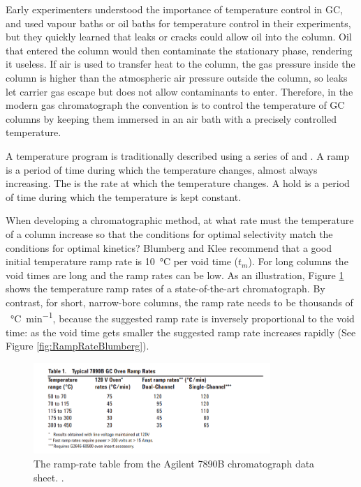 Early experimenters understood the importance of temperature control in GC, and
used vapour baths \autocite{Desty1957} or oil baths \autocite{Eggertsen1956} for
temperature control in their experiments, but they quickly learned that leaks or
cracks could allow oil into the column. Oil that entered the column would then
contaminate the stationary phase, rendering it useless.  If air is used to
transfer heat to the column, the gas pressure inside the column is higher than
the atmospheric air pressure outside the column, so leaks let carrier gas escape
but does not allow contaminants to enter. Therefore, in the modern gas
chromatograph the convention is to control the temperature of GC columns by
keeping them immersed in an air bath with a precisely controlled temperature.

A temperature program is traditionally described using a series of
 and . A ramp is a period of time during which the
temperature changes, almost always increasing. The  is the
rate at which the temperature changes. A hold is a period of time during which
the temperature is kept constant.

When developing a chromatographic method, at what rate must the temperature of a
column increase so that the conditions for optimal selectivity match the
conditions for optimal kinetics? Blumberg and Klee \autocite{Blumberg2000}
recommend that a good initial temperature ramp rate is \SI{10}{\celsius} per
void time (\(t_m\)). For long columns the void times are long and the ramp
rates can be low. As an illustration, Figure \ref{fig:RampRate7890B} shows the
temperature ramp rates of a state-of-the-art chromatograph. By contrast, for
short, narrow-bore columns, the ramp rate needs to be thousands of
\SI{}{\celsius\per\minute}, because the suggested ramp rate is inversely
proportional to the void time: as the void time gets smaller the suggested ramp
rate increases rapidly (See Figure \ref{fig:RampRateBlumberg}).

\begin{figure}
	\centering
	\includegraphics[width=0.8\textwidth]{Figures/7890B.png}
	\decoRule
	\caption[A temperature-rate table from the Agilent7890B data sheet]{The
	ramp-rate table from the Agilent 7890B chromatograph data sheet.
	\autocite{7890B}. }
	\label{fig:RampRate7890B}
\end{figure}

